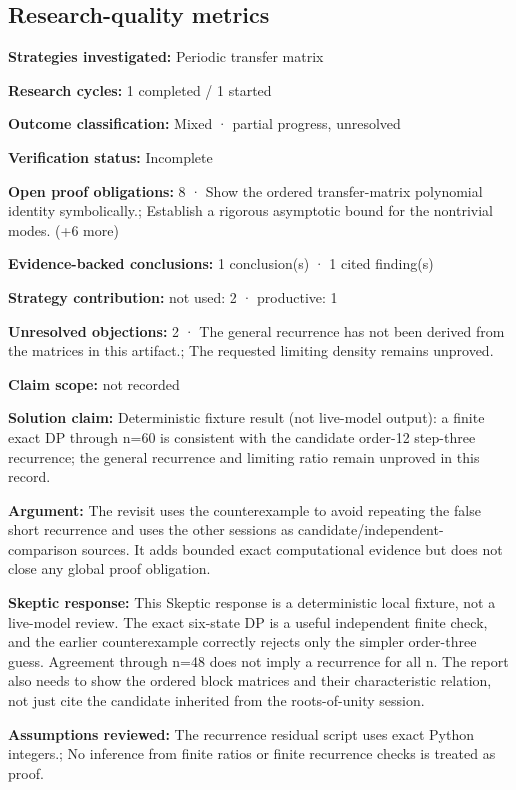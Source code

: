 \documentclass[11pt]{article}
\begin{document}
\subsection{Research-quality metrics}
\textbf{Strategies investigated:} Periodic transfer matrix\par
\textbf{Research cycles:} 1 completed / 1 started\par
\textbf{Outcome classification:} Mixed · partial progress, unresolved\par
\textbf{Verification status:} Incomplete\par
\textbf{Open proof obligations:} 8 · Show the ordered transfer-matrix polynomial identity symbolically.; Establish a rigorous asymptotic bound for the nontrivial modes. (+6 more)\par
\textbf{Evidence-backed conclusions:} 1 conclusion(s) · 1 cited finding(s)\par
\textbf{Strategy contribution:} not used: 2 · productive: 1\par
\textbf{Unresolved objections:} 2 · The general recurrence has not been derived from the matrices in this artifact.; The requested limiting density remains unproved.\par
\textbf{Claim scope:} not recorded\par
\textbf{Solution claim:} Deterministic fixture result (not live-model output): a finite exact DP through n=60 is consistent with the candidate order-12 step-three recurrence; the general recurrence and limiting ratio remain unproved in this record.\par
\textbf{Argument:} The revisit uses the counterexample to avoid repeating the false short recurrence and uses the other sessions as candidate/independent-comparison sources. It adds bounded exact computational evidence but does not close any global proof obligation.\par
\textbf{Skeptic response:} This Skeptic response is a deterministic local fixture, not a live-model review. The exact six-state DP is a useful independent finite check, and the earlier counterexample correctly rejects only the simpler order-three guess. Agreement through n=48 does not imply a recurrence for all n. The report also needs to show the ordered block matrices and their characteristic relation, not just cite the candidate inherited from the roots-of-unity session.\par
\textbf{Assumptions reviewed:} The recurrence residual script uses exact Python integers.; No inference from finite ratios or finite recurrence checks is treated as proof.\par
\end{document}
